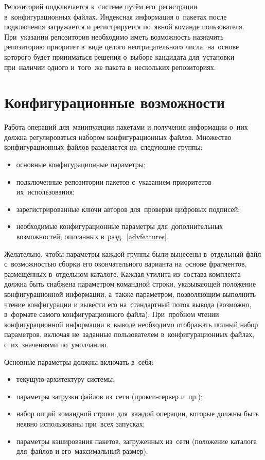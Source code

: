 Репозиторий подключается к~системе путём его~регистрации в~конфигурационных файлах.
Индексная информация о~пакетах после подключения загружается и регистрируется по~явной команде пользователя.
При~указании репозитория необходимо иметь возможность назначить репозиторию приоритет в~виде целого неотрицательного числа,
на~основе которого будет приниматься решения о~выборе кандидата для~установки при~наличии одного и~того~же пакета в~нескольких репозиториях.

\section{Конфигурационные возможности}

Работа операций для~манипуляции пакетами и получения информации о~них должна регулироваться набором конфигурационных файлов.
Множество конфигурационных файлов разделяется на~следующие группы:

\begin{itemize}
\item{основные конфигурационные параметры;}
\item {подключенные репозитории пакетов с~указанием приоритетов их~использования;}
\item {зарегистрированные ключи авторов для~проверки цифровых подписей;}
\item{необходимые конфигурационные параметры для~дополнительных возможностей, описанных в~разд.~\ref{advfeatures}.}
\end{itemize}

Желательно, чтобы параметры каждой группы были вынесены в~отдельный файл с~возможностью 
сборки его окончательного варианта на~основе фрагментов, размещённых в~отдельном каталоге.
Каждая утилита из~состава комплекта должна быть снабжена параметром командной строки,
указывающей положение конфигурационной информации,
а~также параметром, позволяющим выполнить чтение конфигурации и вывести его на~стандартный поток вывода (возможно, в~формате самого конфигурационного файла). 
При~пробном чтении конфигурационной информации в~выводе необходимо    отображать 
полный набор параметров, включая не~заданные пользователем в~конфигурационных файлах, с~их~значениями  по~умолчанию.

Основные параметры должны включать в~себя:

\begin{itemize}
\item {текущую архитектуру системы;}
\item {параметры загрузки файлов из~сети (прокси-сервер и~пр.);}
\item {набор опций командной строки для~каждой операции, которые должны быть неявно использованы при~всех запусках;}
\item {параметры кэширования пакетов, загруженных из~сети (положение каталога для~файлов и его~максимальный размер).}
\end{itemize}
